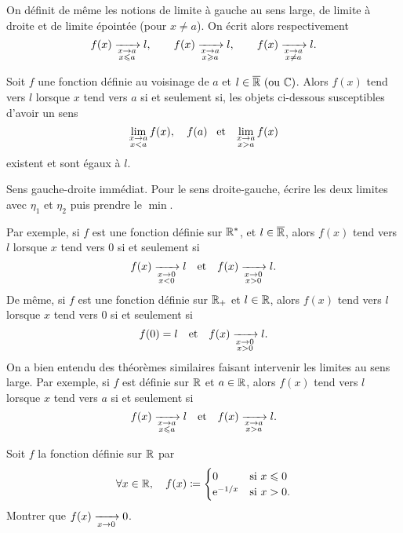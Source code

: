 \documentclass{magnolia}
\begin{document}
\begin{remarqueUnique}
\remarque On définit de même les notions de limite à gauche au sens large, de limite à
  droite et de limite épointée (pour $x\neq a$). On écrit alors respectivement
  \[f(x)\xrightarrow[ \substack{x\rightarrow a \\ x\leqslant a}]{} l, \qquad
    f(x)\xrightarrow[ \substack{x\rightarrow a \\ x\geqslant a}]{} l, \qquad
    f(x)\xrightarrow[ \substack{x\rightarrow a \\ x\not=a}]{} l.\]
\end{remarqueUnique}


\begin{proposition}[utile=-3]
Soit $f$ une fonction définie au voisinage de $a$ et $l\in\text{$\overline{\mathbb{R}}$ (ou $\mathbb{C}$)}$. Alors
$f(x)$ tend vers $l$ lorsque $x$ tend vers $a$ si et seulement si, les objets
ci-dessous susceptibles d'avoir un sens
\[\lim_{\substack{x\to a\\x<a}} f(x), \quad f(a) \quad\!\text{et}\quad\!
  \lim_{\substack{x\to a\\x>a}} f(x)\]
existent et sont égaux à $l$.
\end{proposition}

\begin{preuve}
Sens gauche-droite immédiat.
Pour le sens droite-gauche, écrire les deux limites avec $\eta_1$ et $\eta_2$ puis prendre le $\min$.
\end{preuve}

\begin{remarques}
\remarque Par exemple, si $f$ est une fonction définie sur ${\mathbb{R}^*}$, et $l\in\overline{\mathbb{R}}$,
  alors $f(x)$ tend vers $l$
  lorsque $x$ tend vers 0 si et seulement si
  \[f(x)\xrightarrow[ \substack{x\rightarrow 0 \\ x<0}]{}l \quad\text{et}\quad f(x)\xrightarrow[ \substack{x\rightarrow 0 \\ x>0}]{} l.\]
  De même, si $f$ est une fonction définie sur $\mathbb{R}_+$ et $l\in\mathbb{R}$, alors $f(x)$ tend vers $l$
  lorsque $x$ tend vers 0 si et seulement si
  \[f(0)=l \quad\text{et}\quad f(x)\xrightarrow[ \substack{x\rightarrow 0 \\ x>0}]{} l.\]
\remarque On a bien entendu des théorèmes similaires faisant intervenir les limites au sens
  large. Par
  exemple, si $f$ est définie sur $\mathbb{R}$ et $a\in\mathbb{R}$, alors $f(x)$ tend vers $l$ lorsque $x$
  tend vers $a$ si et seulement si
  \[f(x)\xrightarrow[ \substack{x\rightarrow a \\ x\leqslant a}]{}l \quad\text{et}\quad f(x)\xrightarrow[ \substack{x\rightarrow a \\ x>a}]{} l.\]
\end{remarques}

\begin{exoUnique}
\exo Soit $f$ la fonction définie sur $\mathbb{R}$ par
  \[\forall x\in\mathbb{R} ,\quad f(x)\coloneqq
    \begin{cases}
    0 & \text{si $x\leqslant 0$}\\
    {\rm e}^{-1/x} & \text{si $x>0$}.
    \end{cases}\]
  Montrer que $f(x)\xrightarrow[x\rightarrow 0]{} 0$.
\end{exoUnique}
\end{document}
